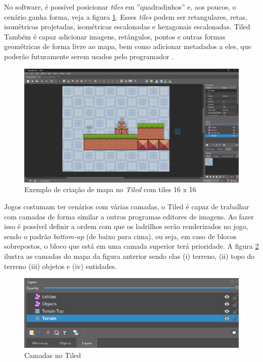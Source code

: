 No software, é possível posicionar \textit{tiles} em ''quadradinhos'' e, aos poucos, o cenário ganha forma, veja a figura \ref{fig:example-tiled}. Esses \textit{tiles} podem ser  retangulares, retas, isométricas projetadas, isométricas escalonadas e hexagonais escalonadas. Tiled Também é capaz adicionar imagens, retângulos, pontos e outras formas geométricas de forma livre ao mapa, bem como adicionar metadados a eles, que poderão futuramente serem usados pelo programador \cite{tiled}. 
\begin{figure}[h!]
    \centering
    \includegraphics[width=1\linewidth]{figuras/example-tiled.png}
    \caption{Exemplo de criação de mapa no \textit{Tiled} com tiles 16 x 16}
    \label{fig:example-tiled}
\end{figure}

Jogos costumam ter cenários com várias camadas, o Tiled é capaz de trabalhar com camadas de forma similar a outros programas editores de imagens. Ao fazer isso é possível definir a ordem com que os ladrilhos serão renderizados no jogo, sendo o padrão \textit{bottom-up} (de baixo para cima), ou seja, em caso de blocos sobrepostos, o bloco que está em uma camada superior terá prioridade. A figura \ref{fig:layers} ilustra as camadas do mapa da figura anterior sendo elas (i) terreno, (ii) topo do terreno (iii) objetos e (iv) entidades. 
\clearpage
\begin{figure}[h!]
    \centering
    \includegraphics[width=1\linewidth]{figuras/layers.png}
    \caption{Camadas no Tiled}
    \label{fig:layers}
\end{figure}

